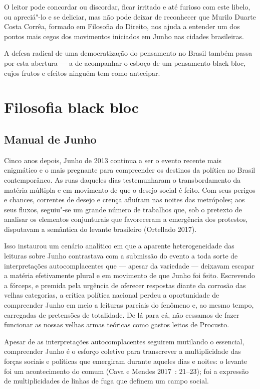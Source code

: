 O leitor pode concordar ou discordar, ficar irritado e até furioso com
este libelo, ou apreciá"-lo e se deliciar, mas não pode deixar de
reconhecer que Murilo Duarte Costa Corrêa, formado em Filosofia do
Direito, nos ajuda a entender um dos pontos mais cegos dos movimentos
iniciados em Junho nas cidades brasileiras.

A defesa radical de uma democratização do pensamento no Brasil também
passa por esta abertura --- a de acompanhar o esboço de um pensamento
black bloc, cujos frutos e efeitos ninguém tem como antecipar.

\part{Filosofia black bloc}

\chapter{Manual de Junho}

Cinco anos depois, Junho de 2013 continua a ser o evento recente mais
enigmático e o mais pregnante para compreender os destinos da política
no Brasil contemporâneo. As ruas daqueles dias testemunharam o
transbordamento da matéria múltipla e em movimento de que o desejo
social é feito. Com seus perigos e chances, correntes de desejo e crença
afluíram nas noites das metrópoles; aos seus fluxos, seguiu"-se um grande
número de trabalhos que, sob o pretexto de analisar os elementos
conjunturais que favoreceram a emergência dos protestos, disputavam a
semântica do levante brasileiro (Ortellado 2017).

Isso instaurou um cenário analítico em que a aparente heterogeneidade
das leituras sobre Junho contrastava com a submissão do evento a toda
sorte de interpretações autocomplacentes que --- apesar da variedade ---
deixavam escapar a matéria efetivamente plural e em movimento de que
Junho foi feito. Escrevendo a fórceps, e premida pela urgência de
oferecer respostas diante da corrosão das velhas categorias, a crítica
política nacional perdeu a oportunidade de compreender Junho em meio a
leituras parciais do fenômeno e, ao mesmo tempo, carregadas de
pretensões de totalidade. De lá para cá, não cessamos de fazer funcionar
as nossas velhas armas teóricas como gastos leitos de Procusto.

Apesar de as interpretações autocomplacentes seguirem mutilando o
essencial, compreender Junho é o esforço coletivo para transcrever a
multiplicidade das forças sociais e políticas que emergiram durante
aqueles dias e noites: o levante foi um acontecimento do comum (Cava e
Mendes 2017~: 21--23); foi a expressão de multiplicidades de linhas de
fuga que definem um campo social.


